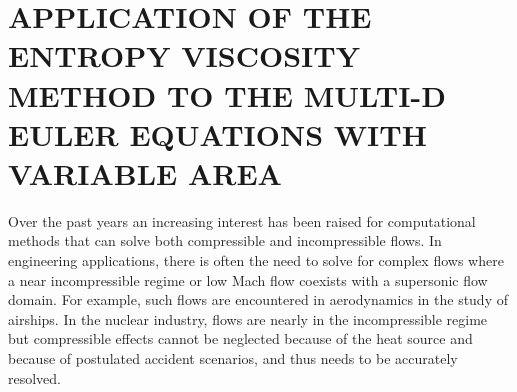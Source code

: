 %
%
%


\chapter{\uppercase {Application of the entropy viscosity method to the multi-D Euler equations with variable area}}\label{chap:euler}
Over the past years an increasing interest has been raised for computational methods that can solve both compressible and incompressible flows. In engineering applications, there is often the need to solve for complex flows where a near incompressible regime or low Mach flow coexists with a supersonic flow domain. For example, such flows are encountered in aerodynamics in the study of airships. In the nuclear industry, flows are nearly in the incompressible regime but compressible effects cannot be neglected because of the heat source and because of postulated accident scenarios, and thus needs to be accurately resolved.

